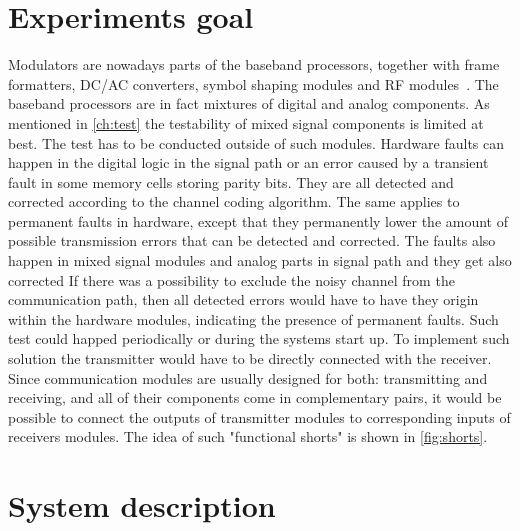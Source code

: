 \documentclass[]{myclass}
\begin{document}
\section{Experiments goal}
Modulators are nowadays parts of the baseband processors, together with frame formatters, DC/AC converters, symbol shaping modules and RF modules~\cite{book:Ismail}. The baseband processors are in fact mixtures of digital and analog components. As mentioned in \autoref{ch:test} the testability of mixed signal components is limited at best. The test has to be conducted outside of such modules.
Hardware faults can happen in the digital logic in the signal path or an error caused by a transient fault in some memory cells storing parity bits. They are all detected and corrected according to the channel coding algorithm. The same applies to permanent faults in hardware, except that they permanently lower the amount of possible transmission errors that can be detected and corrected. The faults also happen in mixed signal modules and analog parts in signal path and they get also corrected 
If there was a possibility to exclude the noisy channel from the communication path, then all detected errors would have to have they origin within the hardware modules, indicating the presence of permanent faults. Such test could happed periodically or during the systems start up.
To implement such solution the transmitter would have to be directly connected with the receiver. Since communication modules are usually designed for both: transmitting and receiving, and all of their components come in complementary pairs, it would be possible to connect the outputs of transmitter modules to corresponding inputs of receivers modules. The idea of such "functional shorts" is shown in \autoref{fig:shorts}.

\section{System description}

\cleardoublepage
\appendix%

%
{}
\cleardoublepage


\end{document}
